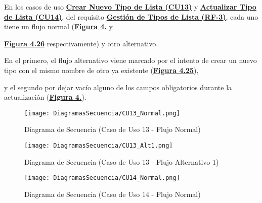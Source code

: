 \addtocounter{figura_cap4}{1}
En los casos de uso \textbf{\hyperref[tab:curCrearTipoLst]{Crear Nuevo Tipo de Lista (CU13)}} y \textbf{\hyperref[tab:curActualizarTipoLst]{Actualizar Tipo de Lista (CU14)}}, del requisito \textbf{\hyperref[tab:rfGestTipoLst]{Gestión de Tipos de Lista (RF-3)}}, cada uno tiene un flujo normal (\textbf{\hyperref[fig:Secuencia_CU13_Normal]{Figura 4.}} y\addtocounter{figura_cap4}{1} \textbf{\hyperref[fig:Secuencia_CU14_Normal]{Figura 4.26}} respectivamente) y otro alternativo.\addtocounter{figura_cap4}{1} En el primero, el flujo alternativo viene marcado por el intento de crear un nuevo tipo con el mismo nombre de otro ya existente (\textbf{\hyperref[fig:Secuencia_CU13_Alt1]{Figura 4.25}}),\addtocounter{figura_cap4}{1} y el segundo por dejar vacío alguno de los campos obligatorios durante la actualización (\textbf{\hyperref[fig:Secuencia_CU14_Alt1]{Figura 4.}}).

\begin{landscape}
  \label{fig:Secuencia_CU13_Normal}
  \vspace*{\fill}
  \begin{figure}[!htbp]
    \centering
    \texttt{[image: DiagramasSecuencia/CU13\_Normal.png]}
    \caption{Diagrama de Secuencia (Caso de Uso 13 - Flujo Normal)}
  \end{figure}
  \vfill
\end{landscape}
\FloatBarrier

\begin{landscape}
  \label{fig:Secuencia_CU13_Alt1}
  \vspace*{\fill}
  \begin{figure}[!htbp]
    \centering
    \texttt{[image: DiagramasSecuencia/CU13\_Alt1.png]}
    \caption{Diagrama de Secuencia (Caso de Uso 13 - Flujo Alternativo 1)}
  \end{figure}
  \vfill
\end{landscape}
\FloatBarrier

\begin{landscape}
  \label{fig:Secuencia_CU14_Normal}
  \vspace*{\fill}
  \begin{figure}[!htbp]
    \centering
    \texttt{[image: DiagramasSecuencia/CU14\_Normal.png]}
    \caption{Diagrama de Secuencia (Caso de Uso 14 - Flujo Normal)}
  \end{figure}
  \vfill
\end{landscape}
\FloatBarrier

